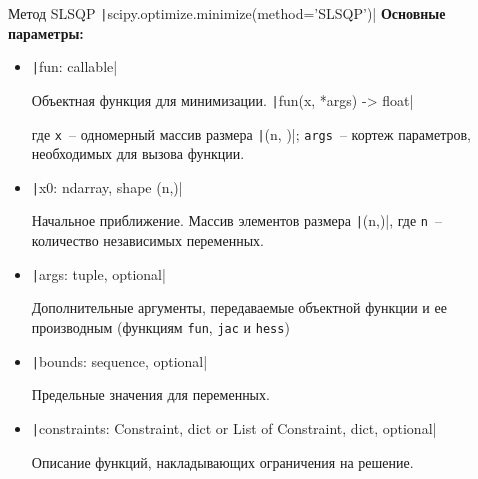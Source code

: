 \documentclass[aspectratio=169, mathserif]{beamer}%
\begin{document}
\begin{frame}[fragile, label=c]{Метод SLSQP}
\scriptsize
\texttt|scipy.optimize.minimize(method='SLSQP')|
\vfill
\textbf{Основные параметры:}
\vfill
\begin{itemize}
\item[] \texttt|fun: callable|

Объектная функция для минимизации.
\vfill
\texttt|fun(x, *args) -> float|

где \texttt{x}~-- одномерный массив размера \texttt|(n, )|; \texttt{args}~-- кортеж параметров, необходимых для вызова функции.
\vfill
\item[] \texttt|x0: ndarray, shape (n,)|

Начальное приближение. Массив элементов размера \texttt|(n,)|, где \texttt{n}~-- количество независимых переменных.
\vfill
\item[] \texttt|args: tuple, optional|

Дополнительные аргументы, передаваемые объектной функции и ее производным (функциям \texttt{fun}, \texttt{jac} и \texttt{hess})
\vfill
\item[] \texttt|bounds: sequence, optional|

Предельные значения для переменных.
\vfill
\item[] \texttt|constraints: {Constraint, dict} or List of {Constraint, dict}, optional|

Описание функций, накладывающих ограничения на решение.
\end{itemize}
\vfill
\end{frame}
\end{document}
